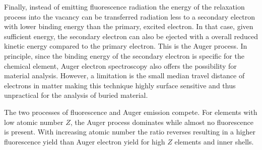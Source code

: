 Finally, instead of emitting fluorescence radiation the energy of the relaxation process into the vacancy can be transferred radiation less to a secondary electron with lower binding energy than the primary, excited electron. In that case, given sufficient energy, the secondary electron can also be ejected with a overall reduced kinetic energy compared to the primary electron. This is the Auger process. In principle, since the binding energy of the secondary electron is specific for the chemical element, Auger electron spectroscopy also offers the possibility for material analysis. However, a limitation is the small median travel distance of electrons in matter making this technique highly surface sensitive and thus unpractical for the analysis of buried material.

The two processes of fluorescence and Auger emission compete. For elements with low atomic number $Z$, the Auger process dominates while almost no fluorescence is present. With increasing atomic number the ratio reverses resulting in a higher fluorescence yield than Auger electron yield for high $Z$ elements and inner shells.

